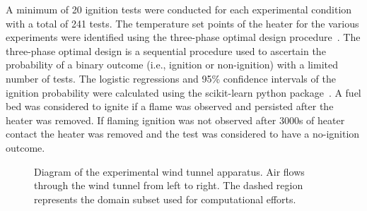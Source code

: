     A minimum of 20 ignition tests were conducted for each experimental condition with a total of 241 tests.  The temperature set points of the heater for the various experiments were identified using the three-phase optimal design procedure~\cite{Wu2014, Burke2017TestPractice}. The three-phase optimal design is a sequential procedure used to ascertain the probability of a binary outcome (i.e., ignition or non-ignition) with a limited number of tests. The logistic regressions and 95\% confidence intervals of the ignition probability were calculated using the scikit-learn python package~\cite{scikit-learn}. A fuel bed was considered to ignite if a flame was observed and persisted after the heater was removed. If flaming ignition was not observed after 3000\si{\second} of heater contact the heater was removed and the test was considered to have a no-ignition outcome.
     \begin{figure}[hbpt]
            \centering
            \caption{Diagram of the experimental wind tunnel apparatus. Air flows through the wind tunnel from left to right. The dashed region represents the domain subset used for computational efforts.}
            \label{fig:windTunnelApparatus}
        \end{figure}
    
